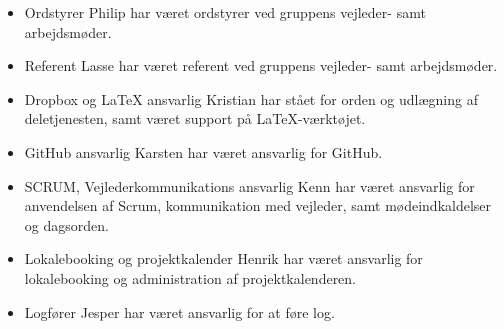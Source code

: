 \begin{itemize}[nosep, parsep=3pt]
	\item Ordstyrer \newline
		Philip har været ordstyrer ved gruppens vejleder- samt arbejdsmøder.
	\item Referent \newline
		Lasse har været referent ved gruppens vejleder- samt arbejdsmøder.
	\item Dropbox og LaTeX ansvarlig\newline
		Kristian har stået for orden og udlægning af deletjenesten, samt været support på LaTeX-værktøjet.
	\item GitHub ansvarlig \newline
		Karsten har været ansvarlig for GitHub.
	\item SCRUM, Vejlederkommunikations ansvarlig\newline
		Kenn har været ansvarlig for anvendelsen af Scrum, kommunikation med vejleder, samt mødeindkaldelser og dagsorden.
	\item Lokalebooking og projektkalender\newline
		Henrik har været ansvarlig for lokalebooking og administration af projektkalenderen.
	\item Logfører \newline
		Jesper har været ansvarlig for at føre log.
\end{itemize}
\clearpage